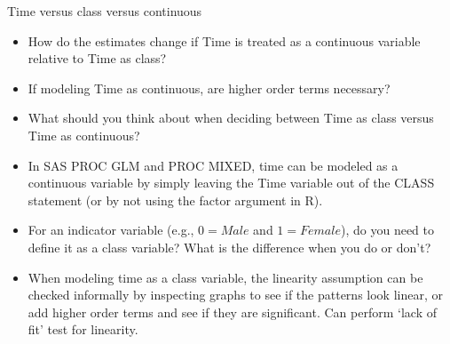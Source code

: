 \documentclass[
  9pt,
  ignorenonframetext,
]{beamer}
\begin{document}
\begin{frame}{Time versus class versus continuous}
\protect\hypertarget{time-versus-class-versus-continuous}{}
\begin{itemize}
\item
  How do the estimates change if Time is treated as a continuous
  variable relative to Time as class?
\item
  If modeling Time as continuous, are higher order terms necessary?
\item
  What should you think about when deciding between Time as class versus
  Time as continuous?
\item
  In SAS PROC GLM and PROC MIXED, time can be modeled as a continuous
  variable by simply leaving the Time variable out of the CLASS
  statement (or by not using the factor argument in R).
\item
  For an indicator variable (e.g., \(0=Male\) and \(1=Female\)), do you
  need to define it as a class variable? What is the difference when you
  do or don't?
\item
  When modeling time as a class variable, the linearity assumption can
  be checked informally by inspecting graphs to see if the patterns look
  linear, or add higher order terms and see if they are significant. Can
  perform `lack of fit' test for linearity.
\end{itemize}
\end{frame}
\end{document}
